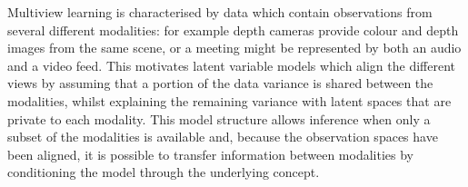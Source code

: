 
Multiview learning is characterised by data which contain
observations from several different modalities: for example depth
cameras provide colour and depth images from the same scene, or a
meeting might be represented by both an audio and a video feed. This
motivates latent variable models which align the different views by
assuming that a portion of the data variance is shared between the
modalities, whilst explaining the remaining variance with latent
spaces that are private to each modality.  This model structure allows
inference when only a subset of the modalities is available and,
because the observation spaces have been aligned, it is possible to
transfer information between modalities by conditioning the model
through the underlying concept.


